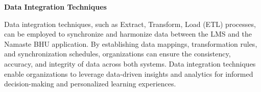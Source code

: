 \textbf{Data Integration Techniques}

Data integration techniques, such as Extract, Transform, Load (ETL) processes, can be employed to synchronize and harmonize data between the LMS and the Namaste BHU application. By establishing data mappings, transformation rules, and synchronization schedules, organizations can ensure the consistency, accuracy, and integrity of data across both systems. Data integration techniques enable organizations to leverage data-driven insights and analytics for informed decision-making and personalized learning experiences.

